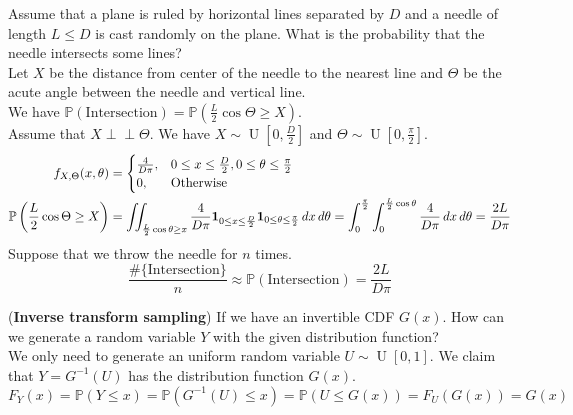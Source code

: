 \documentclass{huhtakm-template-book}
\newcommand{\independent}{\perp\!\!\!\perp}
\newcommand{\prob}{\mathbb{P}}
\DeclareMathOperator{\U}{U}
\begin{document}
\begin{eg}
	Assume that a plane is ruled by horizontal lines separated by $D$ and a needle of length $L\leq D$ is cast randomly on the plane. What is the probability that the needle intersects some lines?\\
	Let $X$ be the distance from center of the needle to the nearest line and $\Theta$ be the acute angle between the needle and vertical line.\\
	We have $\prob(\text{Intersection})=\prob\left(\frac{L}{2}\cos\Theta\geq X\right)$.\\
	Assume that $X\independent\Theta$. We have $X\sim\U\left[0,\frac{D}{2}\right]$ and $\Theta\sim\U\left[0,\frac{\pi}{2}\right]$.
	\begin{align*}
		f_{X,\Theta}(x,\theta)&=\begin{cases}
			\frac{4}{D\pi}, &0\leq x\leq\frac{D}{2},0\leq\theta\leq\frac{\pi}{2}\\
			0, &\text{Otherwise}
		\end{cases}\\
		\prob\left(\frac{L}{2}\cos\Theta\geq X\right)&=\iint_{\frac{L}{2}\cos\theta\geq x}\frac{4}{D\pi}\mathbf{1}_{0\leq x\leq\frac{D}{2}}\mathbf{1}_{0\leq\theta\leq\frac{\pi}{2}}\,dx\,d\theta=\intlu{0}{\frac{\pi}{2}}\intlu{0}{\frac{L}{2}\cos\theta}\frac{4}{D\pi}\,dx\,d\theta=\frac{2L}{D\pi}
	\end{align*}
	Suppose that we throw the needle for $n$ times.
	\begin{equation*}
		\frac{\#\{\text{Intersection}\}}{n}\approx\prob(\text{Intersection})=\frac{2L}{D\pi}
	\end{equation*}
\end{eg}
\begin{eg} (\textbf{Inverse transform sampling})
	If we have an invertible CDF $G(x)$. How can we generate a random variable $Y$ with the given distribution function?\\
	We only need to generate an uniform random variable $U\sim\U[0,1]$. We claim that $Y=G^{-1}(U)$ has the distribution function $G(x)$.
	\begin{equation*}
		F_{Y}(x)=\prob(Y\leq x)=\prob(G^{-1}(U)\leq x)=\prob(U\leq G(x))=F_{U}(G(x))=G(x)
	\end{equation*}
\end{eg}
\end{document}

